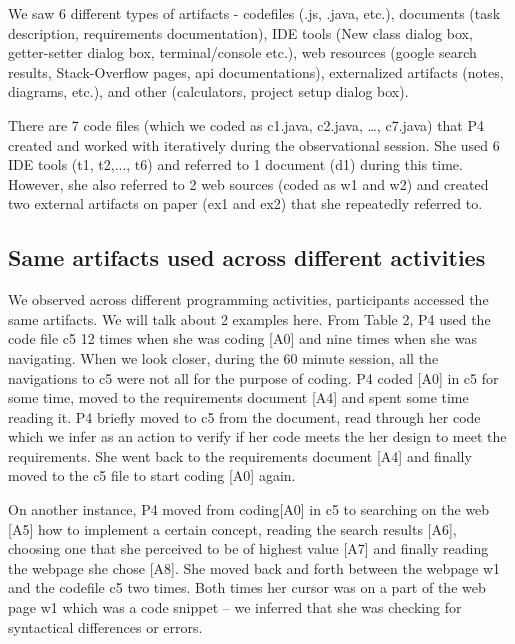 We saw 6 different types of artifacts - codefiles (.js, .java, etc.), documents (task description, requirements documentation), IDE tools (New class dialog box, getter-setter dialog box, terminal/console etc.), web resources (google search results, Stack-Overflow pages, api documentations), externalized artifacts (notes, diagrams, etc.), and other (calculators, project setup dialog box).

There are 7 code files (which we coded as c1.java, c2.java, \ldots, c7.java) that P4 created and worked with iteratively during the observational session. She used 6 IDE tools (t1, t2,..., t6) and referred to 1 document (d1) during this time. However, she also referred to 2 web sources (coded as w1 and w2) and created two external artifacts on paper (ex1 and ex2) that she repeatedly referred to.

\subsection{Same artifacts used across different activities}

We observed across different programming activities, participants accessed the same artifacts. We will talk about 2 examples here. From Table 2, P4 used the code file c5 12 times when she was coding [A0] and nine times when she was navigating. When we look closer, during the 60 minute session, all the navigations to c5 were not all for the purpose of coding. P4 coded [A0] in c5 for some time, moved to the requirements document [A4] and spent some time reading it. P4 briefly moved to c5 from the document, read through her code which we infer as an action to verify if her code meets the her design to meet the requirements. She went back to the requirements document [A4] and finally moved to the c5 file to start coding [A0] again.

On another instance, P4 moved from coding[A0] in c5 to searching on the web [A5] how to implement a certain concept, reading the search results [A6], choosing one that she perceived to be of highest value [A7] and finally reading the webpage she chose [A8]. She moved back and forth between the webpage w1 and the codefile c5 two times. Both times her cursor was on a part of the web page w1 which was a code snippet -- we inferred that she was checking for syntactical differences or errors. 

